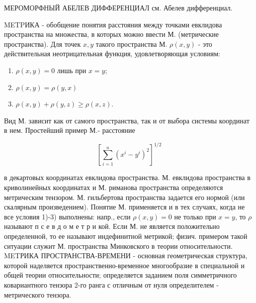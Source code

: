 \documentclass[10pt]{article}
\begin{document}
МЕРОМОРФНЫЙ АБЕЛЕВ ДИФФЕРЕНЦИАЛ см. Абелев дифференциал.



METPИКА - обобщение понятия расстояния между точками евклидова пространства на множества, в которых можно ввести М. (метрические пространства). Для точек $x, y$ такого пространства М. $\rho(x, y)$ - это действительная неотрицательная функция, удовлетворяющая условиям:



\begin{enumerate}

  \item $\rho(x, y)=0$ лишь при $x=y$;



  \item $\rho(x, y)=\rho(y, x)$



  \item $\rho(x, y)+\rho(y, z) \geqslant \rho(x, z)$.



\end{enumerate}



Вид М. зависит как от самого пространства, так и от выбора системы координат в нем. Простейший пример М.- расстояние



\[

\left[\sum_{i=1}^{n}\left(x^{i}-y^{i}\right)^{2}\right]^{1 / 2}

\]



в декартовых координатах евклидова пространства. М. евклидова пространства в криволинейных координатах и М. риманова пространства определяются метрическим тензором. М. гильбертова пространства задается его нормой (или скалярным произведением). Понятие М. применяется и в тех случаях, когда не все условия 1)-3) выполнены: напр., если $\rho(x, y)=0$ не только при $x=y$, то $\rho$ называют п с е в д о м е т р и кой. Если М. не является положительно определенной, то ее называют индефинитной метрикой; физич. примером такой ситуации служит М. пространства Минковского в теории относительности. METРИКА ПРОСТРАНСТВА-ВРЕМЕНИ - основная геометрическая структура, которой наделяется пространственно-временное многообразие в специальной и общей теории относительности; определяется заданием поля симметричного ковариантного тензора 2-го ранга с отличным от нуля определителем - метрического тензора.
\end{document}
